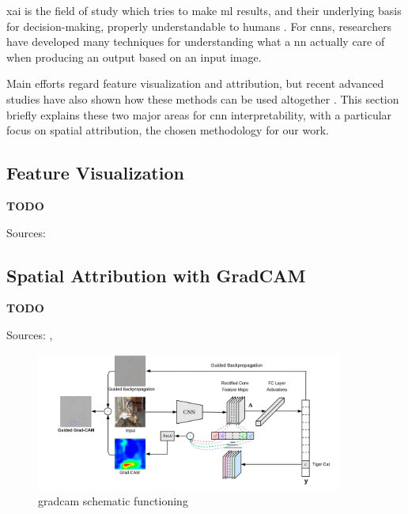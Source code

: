 \medskip

\gls{xai} is the field of study which tries to make \gls{ml} results, and their underlying basis for decision-making, properly understandable to humans \cite{xai-wiki}. For \gls{cnn}s, researchers have developed many techniques for understanding what a \gls{nn} actually care of when producing an output based on an input image. 

Main efforts regard feature visualization and attribution, but recent advanced studies have also shown how these methods can be used altogether \cite{olah2018the}. This section briefly explains these two major areas for \gls{cnn} interpretability, with a particular focus on spatial attribution, the chosen methodology for our work.



\subsection{Feature Visualization}

\textbf{TODO}

Sources: \cite{olah2017feature}



\subsection{Spatial Attribution with GradCAM}
\label{subsec:gradcam-theory}

\textbf{TODO}

Sources: \cite{Selvaraju_2019}, \cite{gradcam_medium}

\begin{figure}[!htb]
	\centering
	\includegraphics[width=0.9\textwidth]{"contents/images/gradcam/02-gradcam-schema"}
	\caption[\gls{gradcam} schematic functioning]{\gls{gradcam} schematic functioning \cite{Selvaraju_2019}}
	\label{fig:gradcam-schema}
\end{figure}

